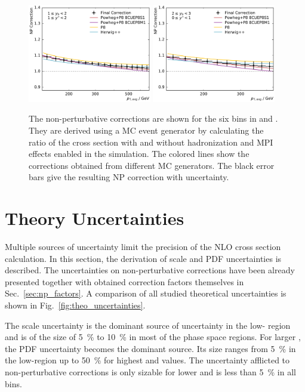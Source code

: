 \begin{figure}[htp]
    \includegraphics[width=0.48\textwidth]{figures/theory/np_factors_nlo_final_yb1ys1.pdf}\hfill
    \includegraphics[width=0.48\textwidth]{figures/theory/np_factors_nlo_final_yb2ys0.pdf}
    \caption[Non-perturbative corrections]{The non-perturbative corrections are
        shown for the six bins in \ystar and \yboost. They are derived using a MC event
        generator by calculating the ratio of the cross section with and without
        hadronization and MPI effects enabled in the simulation. The colored lines
        show the corrections obtained from different MC generators. The black
    error bars give the resulting NP correction with uncertainty.}
    \label{fig:np_factors}
\end{figure}

\section{Theory Uncertainties}

Multiple sources of uncertainty limit the precision of the NLO cross section
calculation. In this section, the derivation of scale and PDF uncertainties is
described. The uncertainties on non-perturbative corrections have been
already presented together with obtained correction factors themselves in
Sec.~\ref{sec:np_factors}. A comparison of all studied theoretical uncertainties
is shown in Fig.~\ref{fig:theo_uncertainties}.

The scale uncertainty is the dominant source of uncertainty in the low-\pt
region and is of the size of \SI{5}{\percent} to \SI{10}{\percent} in most of the phase space regions. For
larger \ptavg, the PDF uncertainty becomes the dominant source. Its size ranges
from \SI{5}{\percent} in the low-\ptavg region up to \SI{50}{\percent} for highest \ptavg and \yboost
values. The uncertainty afflicted to non-perturbative corrections is only
sizable for lower \pt and is less than \SI{5}{\percent} in all bins.

